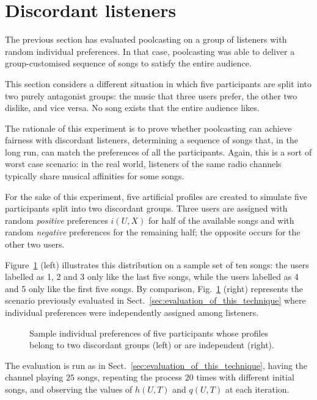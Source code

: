 \section{Discordant listeners} %
\label{sec:discordant_listeners}
 
The previous section has evaluated poolcasting on a group of listeners with random individual preferences. 
In that case, poolcasting was able to deliver a group-customised sequence of songs to satisfy the entire audience.

This section considers a different situation in which five participants are split into two purely antagonist groups: the music that three users prefer, the other two dislike, and vice versa. No song exists that the entire audience likes.

The rationale of this experiment is to prove whether poolcasting can achieve fairness with discordant listeners, determining a sequence of songs that, in the long run, can match the preferences of all the participants.
Again, this is a sort of worst case scenario: in the real world, listeners of the same radio channels typically share musical affinities for some songs.

For the sake of this experiment, five artificial profiles are created to simulate five participants split into two discordant groups.
Three users are assigned with random \emph{positive} preferences $i(U,X)$ for half of the available songs and with random \emph{negative} preferences for the remaining half; the opposite occurs for the other two users.

Figure~\ref{fig:random} (left) illustrates this distribution on a sample set of ten songs: the users labelled as 1, 2 and 3 only like the last five songs, while the users labelled as 4 and 5 only like the first five songs.
By comparison, Fig.~\ref{fig:random} (right) represents the scenario previously evaluated in Sect.~\ref{sec:evaluation_of_this_technique} where individual preferences were independently assigned among listeners.
%
\begin{figure}[bthp]
\centering \setlength{\abovecaptionskip}{3pt}
\caption{Sample individual preferences of five participants whose profiles belong to two discordant groups (left) or are independent (right).}
\label{fig:random}
\end{figure}

The evaluation is run as in Sect.~\ref{sec:evaluation_of_this_technique}, having the channel playing $25$ songs, repeating the process $20$ times with different initial songs, and observing the values of $h(U,T)$ and $q(U,T)$ at each iteration. 

